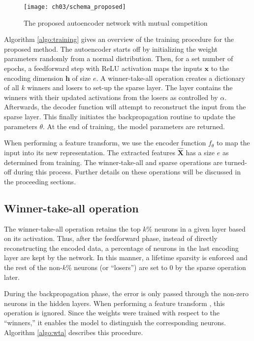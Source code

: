 \begin{figure}[h]
    \centering
    \texttt{[image: ch03/schema\_proposed]}
    \caption[Proposed autoencoder network with mutual competition]
    {The proposed autoencoder network with mutual competition}
    \label{schema:proposed}
\end{figure}

\par Algorithm \ref{algo:training} gives an overview of the training procedure
for the proposed method. The autoencoder starts off by initializing the weight
parameters randomly from a normal distribution. Then, for a set number of
epochs, a feedforward step with ReLU activation maps the inputs $\mathbf{x}$
to the encoding dimension $\mathbf{h}$ of size $e$. A winner-take-all
operation creates a dictionary of all $k$ winners and losers to set-up the
sparse layer. The layer contains the winners with their updated
activations from the losers as controlled by $\alpha$. Afterwards, the
decoder function will attempt to reconstruct the input from the sparse layer.
This finally initiates the backpropagation routine to update the parameters
$\theta$. At the end of training, the model parameters are returned.



\par When performing a feature transform, we use the encoder function
$f_{\theta}$ to map the input into its new representation. The extracted
features $\mathbf{\widehat{X}}$ has a size $e$ as determined from training.
The winner-take-all and sparse operations are turned-off during this process.
Further details on these operations will be discussed in the proceeding
sections.

\subsection{Winner-take-all operation}

\par The winner-take-all operation retains the top $k$\% neurons
in a given layer based on its activation. Thus, after the feedforward phase,
instead of directly reconstructing the encoded data, a percentage of
neurons in the last encoding layer are kept by the network. In this manner, a
lifetime sparsity is enforced and the rest of the non-$k$\% neurons
(or ``losers'') are set to $0$ by the sparse operation later.

\par During the backpropagation phase, the error is only passed through
the non-zero neurons in the hidden layers. When performing a feature transform
, this operation is ignored. Since the weights were trained with
respect to the ``winners,'' it enables the model to distinguish the
corresponding neurons. Algorithm \ref{algo:wta} describes this procedure.

